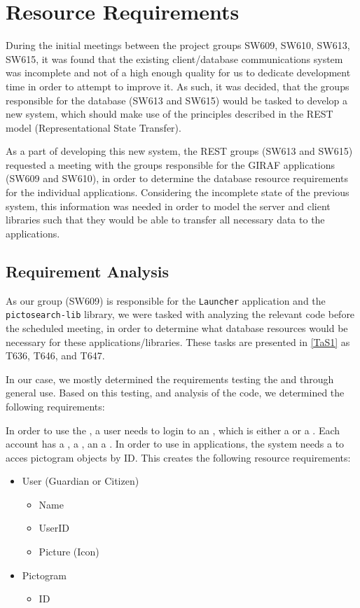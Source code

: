 \chapter{Resource Requirements}\label{S1CS}
During the initial meetings between the project groups SW609, SW610, SW613,
SW615, it was found that the existing client/database communications system was
incomplete and not of a high enough quality for us to dedicate development time
in order to attempt to improve it. As such, it was decided, that the groups
responsible for the database (SW613 and SW615) would be tasked to develop a new
system, which should make use of the principles described in the REST model
(Representational State Transfer).\nl

As a part of developing this new system, the REST groups (SW613 and SW615)
requested a meeting with the groups responsible for the GIRAF applications
(SW609 and SW610), in order to determine the database resource requirements for the
individual applications. Considering the incomplete state of the previous
system, this information was needed in order to model the server and client
libraries such that they would be able to transfer all necessary data to the
applications.\nl

\section{Requirement Analysis}
As our group (SW609) is responsible for the \texttt{Launcher} application and
the \texttt{pictosearch-lib} library, we were tasked with analyzing the relevant
code before the scheduled meeting, in order to determine what database resources
would be necessary for these applications/libraries. These tasks are presented
in \autoref{TaS1} as T636, T646, and T647.\nl

In our case, we mostly determined the requirements testing the 
and  through general use. Based on this testing, and
analysis of the code, we determined the following requirements:\nl

In order to use the , a user needs to login to an
, which is either a  or a . Each
account has a , a , an a .
In order to use  in applications, the system needs a to acces
pictogram objects by ID.
This creates the following resource requirements:

\begin{itemize}
  \item User (Guardian or Citizen)
  	\begin{itemize}
  		\item Name
  		\item UserID
  		\item Picture (Icon) 
	\end{itemize}
  \item Pictogram
  	\begin{itemize}
  		\item ID
	\end{itemize}
\end{itemize}

